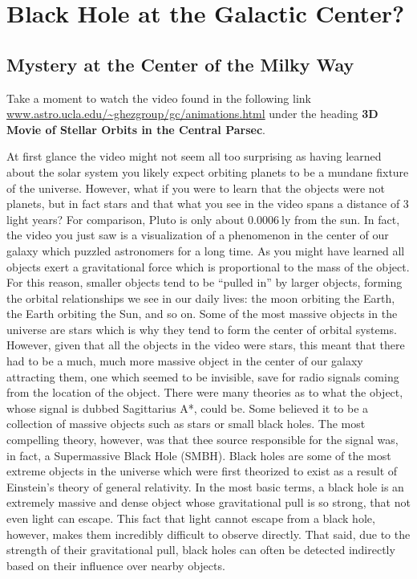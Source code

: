 \chapter{Black Hole at the Galactic Center?}

\section{Mystery at the Center of the Milky Way}
\begin{steps}
	\item Take a moment to watch the video found in the following link \url{www.astro.ucla.edu/~ghezgroup/gc/animations.html} under the heading \textbf{3D Movie of Stellar Orbits in the Central Parsec}.
\end{steps}
At first glance the video might not seem all too surprising as having learned about the solar system you likely expect orbiting planets to be a mundane fixture of the universe. However, what if you were to learn that the objects were not planets, but in fact stars and that what you see in the video spans a distance of 3 light years? For comparison, Pluto is only about $0.0006\:$ly from the sun. In fact, the video you just saw is a visualization of a phenomenon in the center of our galaxy which puzzled astronomers for a long time. As you might have learned all objects exert a gravitational force which is proportional to the mass of the object. For this reason, smaller objects tend to be ``pulled in'' by larger objects, forming the orbital relationships we see in our daily lives: the moon orbiting the Earth, the Earth orbiting the Sun, and so on. Some of the most massive objects in the universe are stars which is why they tend to form the center of orbital systems. However, given that all the objects in the video were stars, this meant that there had to be a much, much more massive object in the center of our galaxy attracting them, one which seemed to be invisible, save for radio signals coming from the location of the object. There were many theories as to what the object, whose signal is dubbed Sagittarius A*, could  be. Some believed it to be a collection of massive objects such as stars or small black holes. The most compelling theory, however, was that thee source responsible for the signal was, in fact, a Supermassive Black Hole (SMBH).
Black holes are some of the most extreme objects in the universe which were first theorized to exist as a result of Einstein's theory of general relativity. In the most basic terms, a black hole is an extremely massive and dense object whose gravitational pull is so strong, that not even light can escape. This fact that light cannot escape from a black hole,  however, makes them incredibly difficult to observe directly. That said, due to the strength of their gravitational pull, black holes can often be detected indirectly based on their influence over nearby objects.

